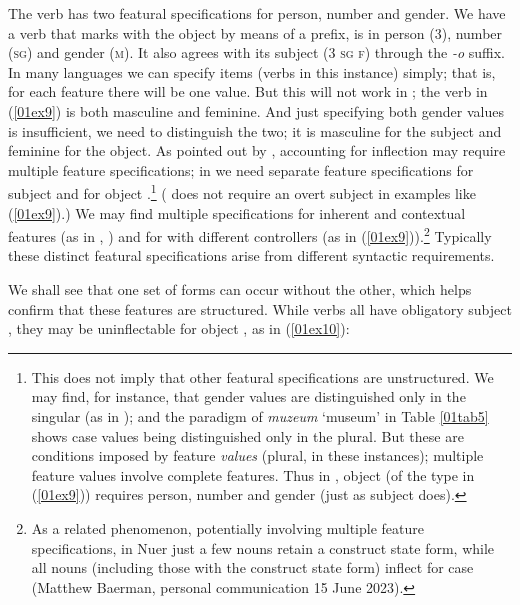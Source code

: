 \documentclass[output=paper,colorlinks,citecolor=brown]{langscibook}
\begin{document}
The verb has two featural specifications for person, number and gender. We have a verb that marks  with the object by means of a prefix,  is in person (\textsc{3}), number (\textsc{sg}) and gender (\textsc{m}). It also agrees with its subject (\textsc{3 sg f}) through the \textit{-o} suffix. In many languages we can specify items (verbs in this instance) simply; that is, for each feature there will be one value. But this will not work in ; the verb in (\ref{01ex9}) is both masculine and feminine. And just specifying both gender values is insufficient, we need to distinguish the two; it is masculine for the subject and feminine for the object. As pointed out by \citet{zwicky1986}, accounting for inflection may require multiple feature specifications; in  we need separate feature specifications for subject  and for object .\footnote{This does not imply that other featural specifications are unstructured. We may find, for instance, that gender values are distinguished only in the singular (as in ); and the  paradigm of \textit{muzeum} `museum' in Table \ref{01tab5} shows case values being distinguished only in the plural. But these are conditions imposed by feature \textit{values} (plural, in these instances); multiple feature values involve complete features. Thus in , object  (of the type in (\ref{01ex9})) requires person, number and gender (just as subject  does).} ( does not require an overt subject in examples like (\ref{01ex9}).) We may find multiple specifications for inherent and contextual features (as in , \citealt{corbett1987}) and for  with different controllers (as in (\ref{01ex9})).\footnote{As a related phenomenon, potentially involving multiple feature specifications, in Nuer just a few nouns retain a construct state form, while all nouns (including those with the construct state form) inflect for case (Matthew Baerman, personal communication 15 June 2023).} Typically these distinct featural specifications arise from different syntactic requirements.

We shall see that one set of forms can occur without the other, which helps confirm that these features are structured. While  verbs all have obligatory subject , they may be uninflectable for object , as in (\ref{01ex10}):

\end{document}
